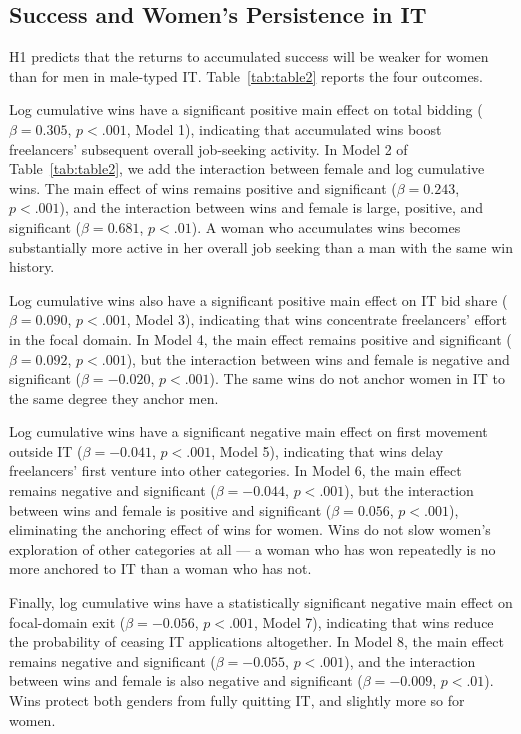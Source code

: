 \documentclass[12pt]{article}
\begin{document}
\subsection{Success and Women's Persistence in IT}

H1 predicts that the returns to accumulated success will be weaker for women than for men in male-typed IT. Table~\ref{tab:table2} reports the four outcomes.

Log cumulative wins have a significant positive main effect on total bidding ($\beta = 0.305$, $p < .001$, Model 1), indicating that accumulated wins boost freelancers' subsequent overall job-seeking activity. In Model 2 of Table~\ref{tab:table2}, we add the interaction between female and log cumulative wins. The main effect of wins remains positive and significant ($\beta = 0.243$, $p < .001$), and the interaction between wins and female is large, positive, and significant ($\beta = 0.681$, $p < .01$). A woman who accumulates wins becomes substantially more active in her overall job seeking than a man with the same win history.

Log cumulative wins also have a significant positive main effect on IT bid share ($\beta = 0.090$, $p < .001$, Model 3), indicating that wins concentrate freelancers' effort in the focal domain. In Model 4, the main effect remains positive and significant ($\beta = 0.092$, $p < .001$), but the interaction between wins and female is negative and significant ($\beta = -0.020$, $p < .001$). The same wins do not anchor women in IT to the same degree they anchor men.

Log cumulative wins have a significant negative main effect on first movement outside IT ($\beta = -0.041$, $p < .001$, Model 5), indicating that wins delay freelancers' first venture into other categories. In Model 6, the main effect remains negative and significant ($\beta = -0.044$, $p < .001$), but the interaction between wins and female is positive and significant ($\beta = 0.056$, $p < .001$), eliminating the anchoring effect of wins for women. Wins do not slow women's exploration of other categories at all --- a woman who has won repeatedly is no more anchored to IT than a woman who has not.

Finally, log cumulative wins have a statistically significant negative main effect on focal-domain exit ($\beta = -0.056$, $p < .001$, Model 7), indicating that wins reduce the probability of ceasing IT applications altogether. In Model 8, the main effect remains negative and significant ($\beta = -0.055$, $p < .001$), and the interaction between wins and female is also negative and significant ($\beta = -0.009$, $p < .01$). Wins protect both genders from fully quitting IT, and slightly more so for women.
\end{document}
